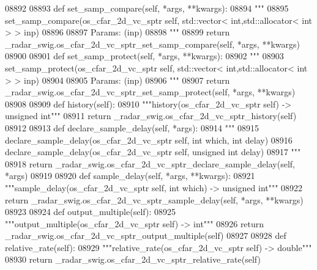 \begin{DoxyCode}
{{{{{{{{{{{{{{{{{{{{{{{{{{{{{08892 
08893     \textcolor{keyword}{def }set_samp_compare(self, *args, **kwargs):
08894         \textcolor{stringliteral}{"""}
08895 \textcolor{stringliteral}{        set\_samp\_compare(os\_cfar\_2d\_vc\_sptr self, std::vector< int,std::allocator< int > > inp)}
08896 \textcolor{stringliteral}{}
08897 \textcolor{stringliteral}{        Params: (inp)}
08898 \textcolor{stringliteral}{        """}
08899         \textcolor{keywordflow}{return} \_radar\_swig.os\_cfar\_2d\_vc\_sptr\_set\_samp\_compare(self, *args, **kwargs)
08900 
08901     \textcolor{keyword}{def }set_samp_protect(self, *args, **kwargs):
08902         \textcolor{stringliteral}{"""}
08903 \textcolor{stringliteral}{        set\_samp\_protect(os\_cfar\_2d\_vc\_sptr self, std::vector< int,std::allocator< int > > inp)}
08904 \textcolor{stringliteral}{}
08905 \textcolor{stringliteral}{        Params: (inp)}
08906 \textcolor{stringliteral}{        """}
08907         \textcolor{keywordflow}{return} \_radar\_swig.os\_cfar\_2d\_vc\_sptr\_set\_samp\_protect(self, *args, **kwargs)
08908 
08909     \textcolor{keyword}{def }history(self):
08910         \textcolor{stringliteral}{"""history(os\_cfar\_2d\_vc\_sptr self) -> unsigned int"""}
08911         \textcolor{keywordflow}{return} \_radar\_swig.os\_cfar\_2d\_vc\_sptr\_history(self)
08912 
08913     \textcolor{keyword}{def }declare_sample_delay(self, *args):
08914         \textcolor{stringliteral}{"""}
08915 \textcolor{stringliteral}{        declare\_sample\_delay(os\_cfar\_2d\_vc\_sptr self, int which, int delay)}
08916 \textcolor{stringliteral}{        declare\_sample\_delay(os\_cfar\_2d\_vc\_sptr self, unsigned int delay)}
08917 \textcolor{stringliteral}{        """}
08918         \textcolor{keywordflow}{return} \_radar\_swig.os\_cfar\_2d\_vc\_sptr\_declare\_sample\_delay(self, *args)
08919 
08920     \textcolor{keyword}{def }sample_delay(self, *args, **kwargs):
08921         \textcolor{stringliteral}{"""sample\_delay(os\_cfar\_2d\_vc\_sptr self, int which) -> unsigned int"""}
08922         \textcolor{keywordflow}{return} \_radar\_swig.os\_cfar\_2d\_vc\_sptr\_sample\_delay(self, *args, **kwargs)
08923 
08924     \textcolor{keyword}{def }output_multiple(self):
08925         \textcolor{stringliteral}{"""output\_multiple(os\_cfar\_2d\_vc\_sptr self) -> int"""}
08926         \textcolor{keywordflow}{return} \_radar\_swig.os\_cfar\_2d\_vc\_sptr\_output\_multiple(self)
08927 
08928     \textcolor{keyword}{def }relative_rate(self):
08929         \textcolor{stringliteral}{"""relative\_rate(os\_cfar\_2d\_vc\_sptr self) -> double"""}
08930         \textcolor{keywordflow}{return} \_radar\_swig.os\_cfar\_2d\_vc\_sptr\_relative\_rate(self)
}}}}}}}}}}}}}}}}}}}}}}}}}}}}}
\end{DoxyCode}
